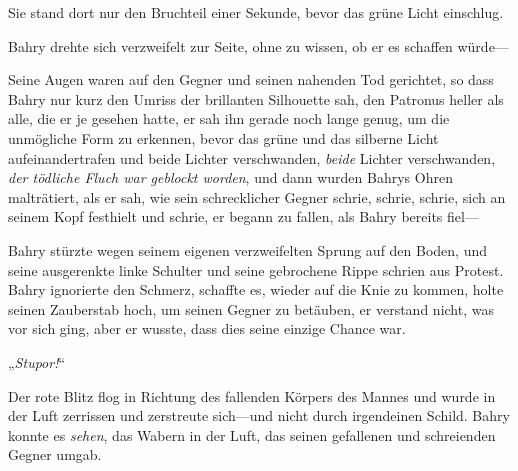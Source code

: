 Sie stand dort nur den Bruchteil einer Sekunde, bevor das grüne Licht einschlug.

\later

Bahry drehte sich verzweifelt zur Seite, ohne zu wissen, ob er es schaffen würde—

Seine Augen waren auf den Gegner und seinen nahenden Tod gerichtet, so dass Bahry nur kurz den Umriss der brillanten Silhouette sah, den Patronus heller als alle, die er je gesehen hatte, er sah ihn gerade noch lange genug, um die unmögliche Form zu erkennen, bevor das grüne und das silberne Licht aufeinandertrafen und beide Lichter verschwanden, \emph{beide} Lichter verschwanden, \emph{der tödliche Fluch war geblockt worden}, und dann wurden Bahrys Ohren malträtiert, als er sah, wie sein schrecklicher Gegner schrie, schrie, schrie, sich an seinem Kopf festhielt und schrie, er begann zu fallen, als Bahry bereits fiel—

Bahry stürzte wegen seinem eigenen verzweifelten Sprung auf den Boden, und seine ausgerenkte linke Schulter und seine gebrochene Rippe schrien aus Protest. Bahry ignorierte den Schmerz, schaffte es, wieder auf die Knie zu kommen, holte seinen Zauberstab hoch, um seinen Gegner zu betäuben, er verstand nicht, was vor sich ging, aber er wusste, dass dies seine einzige Chance war.

„\emph{Stupor!}“

Der rote Blitz flog in Richtung des fallenden Körpers des Mannes und wurde in der Luft zerrissen und zerstreute sich—und nicht durch irgendeinen Schild. Bahry konnte es \emph{sehen}, das Wabern in der Luft, das seinen gefallenen und schreienden Gegner umgab.

